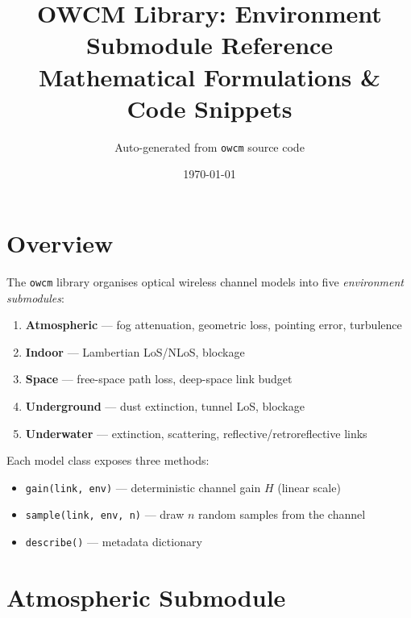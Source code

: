 \documentclass[11pt,a4paper]{article}
\title{\textbf{OWCM Library: Environment Submodule Reference}\\[0.3em]
\large Mathematical Formulations \& Code Snippets}
\author{Auto-generated from \texttt{owcm} source code}
\date{\today}
\begin{document}
\maketitle
\tableofcontents
\newpage

\section{Overview}

The \texttt{owcm} library organises optical wireless channel models into five
\emph{environment submodules}:

\begin{enumerate}[leftmargin=2em]
  \item \textbf{Atmospheric} --- fog attenuation, geometric loss, pointing error, turbulence
  \item \textbf{Indoor} --- Lambertian LoS/NLoS, blockage
  \item \textbf{Space} --- free-space path loss, deep-space link budget
  \item \textbf{Underground} --- dust extinction, tunnel LoS, blockage
  \item \textbf{Underwater} --- extinction, scattering, reflective/retroreflective links
\end{enumerate}

Each model class exposes three methods:
\begin{itemize}
  \item \texttt{gain(link, env)} --- deterministic channel gain $H$ (linear scale)
  \item \texttt{sample(link, env, n)} --- draw $n$ random samples from the channel
  \item \texttt{describe()} --- metadata dictionary
\end{itemize}

\newpage
\section{Atmospheric Submodule}
\end{document}
